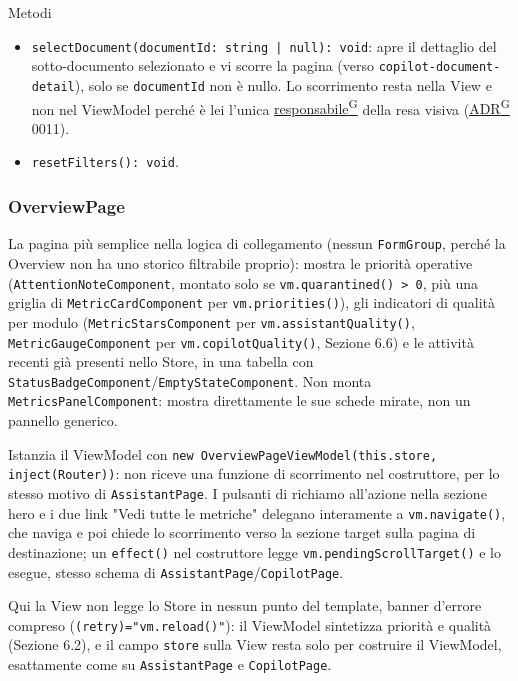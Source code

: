 \documentclass[a4paper,12pt]{article}
\providecommand{\glslink}[2]{\href{https://alittlebyte-19.github.io/Documentazione/glossario.html\#gls-#1}{\underline{#2}\textsuperscript{\scriptsize G}}}
\begin{document}
\begin{sloppypar}
Metodi
\begin{itemize}\raggedright
    \item \texttt{selectDocument(documentId: string | null): void}: apre il dettaglio del sotto-documento selezionato e vi scorre la pagina (verso \texttt{copilot-document-detail}), solo se \texttt{documentId} non è nullo. Lo scorrimento resta nella View e non nel ViewModel perché è lei l'unica \glslink{responsabile}{responsabile} della resa visiva (\glslink{analisi-dei-requisiti-adr}{ADR} 0011).
    \item \texttt{resetFilters(): void}.
\end{itemize}

\subsubsection{OverviewPage}

La pagina più semplice nella logica di collegamento (nessun \texttt{FormGroup}, perché la Overview non ha uno storico filtrabile proprio): mostra le priorità operative (\texttt{AttentionNoteComponent}, montato solo se \texttt{vm.quarantined() > 0}, più una griglia di \texttt{MetricCardComponent} per \texttt{vm.priorities()}), gli indicatori di qualità per modulo (\texttt{MetricStarsComponent} per \texttt{vm.assistantQuality()}, \texttt{MetricGaugeComponent} per \texttt{vm.copilotQuality()}, Sezione 6.6) e le attività recenti già presenti nello Store, in una tabella con \texttt{StatusBadgeComponent}/\texttt{EmptyStateComponent}. Non monta \texttt{MetricsPanelComponent}: mostra direttamente le sue schede mirate, non un pannello generico.

Istanzia il ViewModel con \texttt{new OverviewPageViewModel(this.store, inject(Router))}: non riceve una funzione di scorrimento nel costruttore, per lo stesso motivo di \texttt{AssistantPage}. I pulsanti di richiamo all'azione nella sezione hero e i due link "Vedi tutte le metriche" delegano interamente a \texttt{vm.navigate()}, che naviga e poi chiede lo scorrimento verso la sezione target sulla pagina di destinazione; un \texttt{effect()} nel costruttore legge \texttt{vm.pendingScrollTarget()} e lo esegue, stesso schema di \texttt{AssistantPage}/\texttt{CopilotPage}.

Qui la View non legge lo Store in nessun punto del template, banner d'errore compreso (\texttt{(retry)="vm.reload()"}): il ViewModel sintetizza priorità e qualità (Sezione 6.2), e il campo \texttt{store} sulla View resta solo per costruire il ViewModel, esattamente come su \texttt{AssistantPage} e \texttt{CopilotPage}.


\end{sloppypar}
\end{document}
